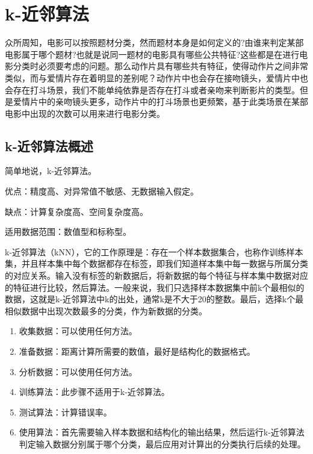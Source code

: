\chapter{k-近邻算法\label{chapter02}}
众所周知，电影可以按照题材分类，然而题材本身是如何定义的?由谁来判定某部电影属于哪个题材?也就是说同一题材的电影具有哪些公共特征?这些都是在进行电影分类时必须要考虑的问题。那么动作片具有哪些共有特征，使得动作片之间非常类似，而与爱情片存在着明显的差别呢？动作片中也会存在接吻镜头，爱情片中也会存在打斗场景，我们不能单纯依靠是否存在打斗或者亲吻来判断影片的类型。但是爱情片中的亲吻镜头更多，动作片中的打斗场景也更频繁，基于此类场景在某部电影中出现的次数可以用来进行电影分类。

\section{k-近邻算法概述}
简单地说，k-近邻算法。

\begin{tcolorbox}[title=k-近邻算法]
    优点：精度高、对异常值不敏感、无数据输入假定。

    缺点：计算复杂度高、空间复杂度高。

    适用数据范围：数值型和标称型。
\end{tcolorbox}

k-近邻算法（kNN），它的工作原理是：存在一个样本数据集合，也称作训练样本集，并且样本集中每个数据都存在标签，即我们知道样本集中每一数据与所属分类的对应关系。输入没有标签的新数据后，将新数据的每个特征与样本集中数据对应的特征进行比较，然后算法。一般来说，我们只选择样本数据集中前k个最相似的数据，这就是k-近邻算法中k的出处，通常k是不大于20的整数。最后，选择k个最相似数据中出现次数最多的分类，作为新数据的分类。


\begin{tcolorbox}[title=k-近邻算法的一般流程]
    \begin{enumerate}
        \item 收集数据：可以使用任何方法。
        \item 准备数据：距离计算所需要的数值，最好是结构化的数据格式。
        \item 分析数据：可以使用任何方法。
        \item 训练算法：此步骤不适用于k-近邻算法。
        \item 测试算法：计算错误率。
        \item 使用算法：首先需要输入样本数据和结构化的输出结果，然后运行k-近邻算法判定输入数据分别属于哪个分类，最后应用对计算出的分类执行后续的处理。
    \end{enumerate}
\end{tcolorbox}

